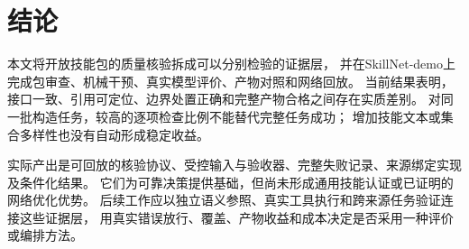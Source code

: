 \section{结论}
本文将开放技能包的质量核验拆成可以分别检验的证据层，
并在SkillNet-demo上完成包审查、机械干预、真实模型评价、产物对照和网络回放。
当前结果表明，接口一致、引用可定位、边界处置正确和完整产物合格之间存在实质差别。
对同一批构造任务，较高的逐项检查比例不能替代完整任务成功；
增加技能文本或集合多样性也没有自动形成稳定收益。

实际产出是可回放的核验协议、受控输入与验收器、完整失败记录、来源绑定实现及条件化结果。
它们为可靠决策提供基础，但尚未形成通用技能认证或已证明的网络优化优势。
后续工作应以独立语义参照、真实工具执行和跨来源任务验证连接这些证据层，
用真实错误放行、覆盖、产物收益和成本决定是否采用一种评价或编排方法。
